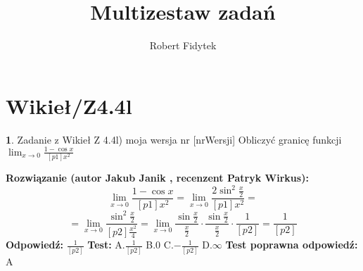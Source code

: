 \documentclass[12pt, a4paper]{article}
\title{Multizestaw zadań}
\author{Robert Fidytek}
\date{}
\theoremstyle{definition} %
\newtheorem{zad}{}
\newcommand{\kategoria}[1]{\section{#1}} %
\newcommand{\zadStart}[1]{\begin{zad}#1\newline} %
\newcommand{\zadStop}{\end{zad}}   %
\newcommand{\rozwStart}[2]{\noindent \textbf{Rozwiązanie (autor #1 , recenzent #2): }\newline} %
\newcommand{\rozwStop}{\newline}                                            %
\newcommand{\odpStart}{\noindent \textbf{Odpowiedź:}\newline}    %
\newcommand{\odpStop}{\newline}                                             %
\newcommand{\testStart}{\noindent \textbf{Test:}\newline} %
\newcommand{\testStop}{\newline} %
\newcommand{\kluczStart}{\noindent \textbf{Test poprawna odpowiedź:}\newline} %
\newcommand{\kluczStop}{\newline} %
\begin{document}
\maketitle


\kategoria{Wikieł/Z4.4l}
\zadStart{Zadanie z Wikieł Z 4.4l) moja wersja nr [nrWersji]}
Obliczyć granicę funkcji $\lim_{x \to 0} \frac{1-\cos{x}}{[p1]x^2}$
\zadStop
\rozwStart{Jakub Janik}{Patryk Wirkus}
$$\lim_{x \to 0} \frac{1-\cos{x}}{[p1]x^2}=\lim_{x \to 0} \frac{2\sin^2{\frac{x}{2}}}{[p1]x^2}=$$
$$=\lim_{x \to 0} \frac{\sin^2{\frac{x}{2}}}{[p2]\frac{x^2}{4}}=\lim_{x \to 0} \frac{\sin{\frac{x}{2}}}{\frac{x}{2}}\cdot\frac{\sin{\frac{x}{2}}}{\frac{x}{2}}\cdot\frac{1}{[p2]}=\frac{1}{[p2]}$$
\rozwStop
\odpStart
$\frac{1}{[p2]}$
\odpStop
\testStart
A.$\frac{1}{[p2]}$
B.$0$
C.$-\frac{1}{[p2]}$
D.$\infty$
\testStop
\kluczStart
A
\kluczStop
\end{document}
